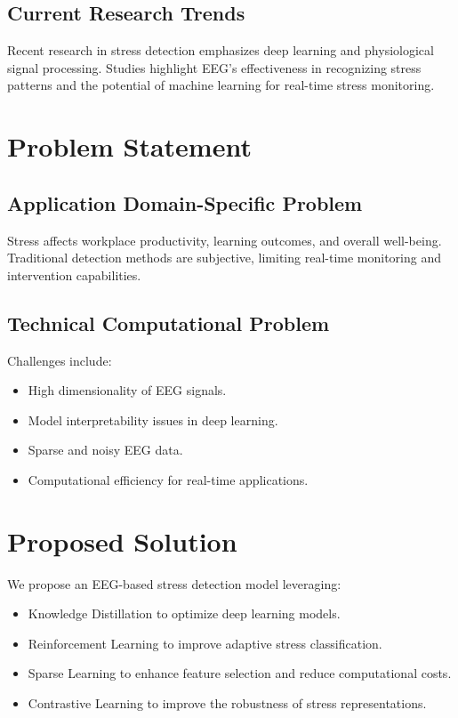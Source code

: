 \documentclass[a4paper,10pt]{article}
\begin{document}
\subsection{Current Research Trends}
Recent research in stress detection emphasizes deep learning and physiological signal processing. Studies highlight EEG's effectiveness in recognizing stress patterns and the potential of machine learning for real-time stress monitoring.

\section{Problem Statement}

\subsection{Application Domain-Specific Problem}
Stress affects workplace productivity, learning outcomes, and overall well-being. Traditional detection methods are subjective, limiting real-time monitoring and intervention capabilities.

\subsection{Technical Computational Problem}
Challenges include:
\begin{itemize}
    \item High dimensionality of EEG signals.
    \item Model interpretability issues in deep learning.
    \item Sparse and noisy EEG data.
    \item Computational efficiency for real-time applications.
\end{itemize}

\section{Proposed Solution}
We propose an EEG-based stress detection model leveraging:
\begin{itemize}
    \item Knowledge Distillation to optimize deep learning models.
    \item Reinforcement Learning to improve adaptive stress classification.
    \item Sparse Learning to enhance feature selection and reduce computational costs.
    \item Contrastive Learning to improve the robustness of stress representations.
\end{itemize}
\end{document}

